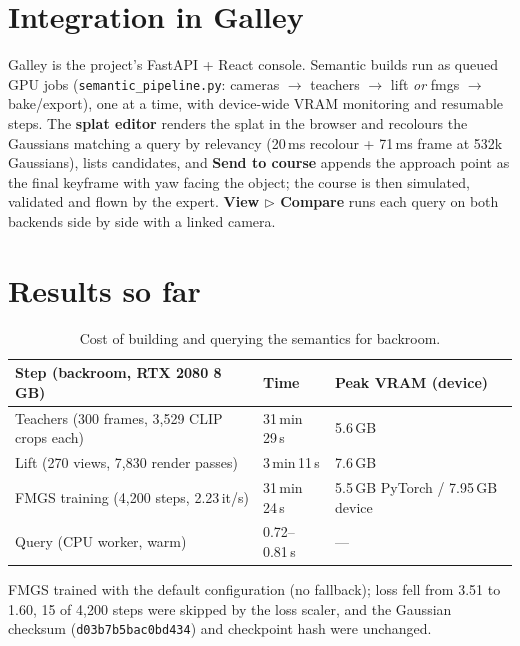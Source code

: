 \documentclass[11pt,a4paper]{article}
\newcommand{\code}[1]{\texttt{#1}}
\begin{document}
\section{Integration in Galley}
Galley is the project's FastAPI + React console. Semantic builds run as queued GPU jobs
(\code{semantic\_pipeline.py}: cameras $\rightarrow$ teachers $\rightarrow$ lift \emph{or} fmgs $\rightarrow$ bake/export),
one at a time, with device-wide VRAM monitoring and resumable steps. The \textbf{splat editor} renders the splat in
the browser and recolours the Gaussians matching a query by relevancy (20\,ms recolour + 71\,ms frame at 532k
Gaussians), lists candidates, and \textbf{Send to course} appends the approach point as the final keyframe with yaw
facing the object; the course is then simulated, validated and flown by the expert. \textbf{View $\triangleright$
Compare} runs each query on both backends side by side with a linked camera.

\section{Results so far}

\begin{table}[ht]
\centering\small
\begin{tabular}{@{}lll@{}}
\toprule
Step (backroom, RTX 2080 8\,GB) & Time & Peak VRAM (device) \\
\midrule
Teachers (300 frames, 3{,}529 CLIP crops each) & 31\,min\,29\,s & 5.6\,GB \\
Lift (270 views, 7{,}830 render passes) & 3\,min\,11\,s & 7.6\,GB \\
FMGS training (4{,}200 steps, 2.23\,it/s) & 31\,min\,24\,s & 5.5\,GB PyTorch / 7.95\,GB device \\
Query (CPU worker, warm) & 0.72--0.81\,s & --- \\
\bottomrule
\end{tabular}
\caption{Cost of building and querying the semantics for backroom.}
\end{table}

FMGS trained with the default configuration (no fallback); loss fell from 3.51 to 1.60, 15 of 4{,}200 steps were
skipped by the loss scaler, and the Gaussian checksum (\code{d03b7b5bac0bd434}) and checkpoint hash were unchanged.
\end{document}
